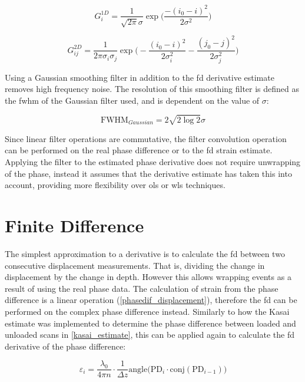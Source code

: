 \begin{equation}
	\label{gauss_1d}
	G^{1D}_i = \frac{1}{\sqrt{2\pi} \sigma} \exp{\bigg(\frac{-(i_0-i)^2}{2 \sigma^2}\bigg)}
\end{equation}

\begin{equation}
	\label{gauss_2d}
	G^{2D}_{ij} = \frac{1}{2\pi \sigma_i \sigma_j } \exp{ 
	\bigg( - \frac{(i_0 - i)^2}{2 \sigma_i^2} - \frac{(j_0 - j)^2}{2 \sigma_j^2} \bigg)}
\end{equation}

Using a Gaussian smoothing filter in addition to the \ac{fd} derivative estimate removes high frequency noise. The resolution of this smoothing filter is defined as the \ac{fwhm} of the Gaussian filter used, and is dependent on the value of $\sigma$:

\begin{equation}
	\label{gauss_fwhm}
	\text{FWHM}_{Gaussian} = 2 \sqrt{2 \log{2}} \sigma
\end{equation}

Since linear filter operations are commutative, the filter convolution operation can be performed on the real phase difference or to the \ac{fd} strain estimate. Applying the filter to the estimated phase derivative does not require unwrapping of the phase, instead it assumes that the derivative estimate has taken this into account, providing more flexibility over \ac{ols} or \ac{wls} techniques.

\section{Finite Difference}\label{fd}

The simplest approximation to a derivative is to calculate the \ac{fd} between two consecutive displacement measurements. That is, dividing the change in displacement by the change in depth. However this allows wrapping events as a result of using the real phase data. The calculation of strain from the phase difference is a linear operation (\autoref{phasedif_displacement}), therefore the \ac{fd} can be performed on the complex phase difference instead. Similarly to how the Kasai estimate was implemented to determine the phase difference between loaded and unloaded scans in \autoref{kasai_estimate}, this can be applied again to calculate the \ac{fd} derivative of the phase difference:

\begin{equation}
	\varepsilon_i = \frac{\lambda_0}{4\pi n} \cdot \frac{1}{\Delta z} \text{angle}\bigg( \text{PD}_i \cdot \text{conj}(\text{PD}_{i-1}) \bigg)
	\label{fd_strain}
\end{equation}

